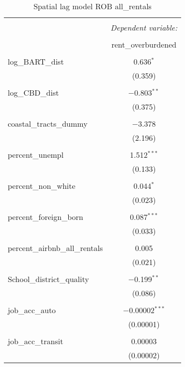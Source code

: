 \documentclass[10pt, letterpaper]{amsart}
\begin{document}
\begin{table}[H] \centering 
  \caption{Spatial lag model ROB all\_rentals}
  \label{}
  \begin{tabular}{@{\extracolsep{5pt}}lc} 
    \\[-1.8ex]\hline 
    \hline \\[-1.8ex] 
    & \multicolumn{1}{c}{\textit{Dependent variable:}} \\ 
    \cline{2-2} 
    \\[-1.8ex] & rent\_overburdened \\ 
    \hline \\[-1.8ex] 
    log\_BART\_dist & 0.636$^{*}$ \\ 
    & (0.359) \\ 
    & \\ 
    log\_CBD\_dist & $-$0.803$^{**}$ \\ 
    & (0.375) \\ 
    & \\ 
    coastal\_tracts\_dummy & $-$3.378 \\ 
    & (2.196) \\ 
    & \\ 
    percent\_unempl & 1.512$^{***}$ \\ 
    & (0.133) \\ 
    & \\ 
    percent\_non\_white & 0.044$^{*}$ \\ 
    & (0.023) \\ 
    & \\ 
    percent\_foreign\_born & 0.087$^{***}$ \\ 
    & (0.033) \\ 
    & \\ 
    percent\_airbnb\_all\_rentals & 0.005 \\ 
    & (0.021) \\ 
    & \\ 
    School\_district\_quality & $-$0.199$^{**}$ \\ 
    & (0.086) \\ 
    & \\ 
    job\_acc\_auto & $-$0.00002$^{***}$ \\ 
    & (0.00001) \\ 
    & \\ 
    job\_acc\_transit & 0.00003 \\ 
    & (0.00002) \\ 

\end{tabular}
\end{table}
\end{document}
